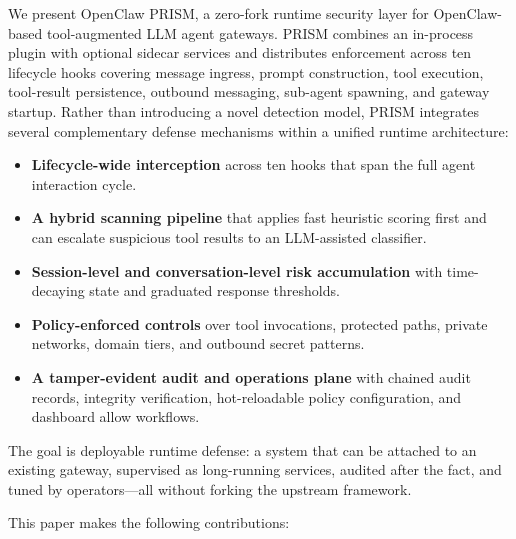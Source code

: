 We present OpenClaw PRISM, a zero-fork runtime security layer for OpenClaw-based tool-augmented LLM agent gateways. PRISM combines an in-process plugin with optional sidecar services and distributes enforcement across ten lifecycle hooks covering message ingress, prompt construction, tool execution, tool-result persistence, outbound messaging, sub-agent spawning, and gateway startup. Rather than introducing a novel detection model, PRISM integrates several complementary defense mechanisms within a unified runtime architecture:

\begin{itemize}[leftmargin=1.5em]
  \item \textbf{Lifecycle-wide interception} across ten hooks that span the full agent interaction cycle.
  \item \textbf{A hybrid scanning pipeline} that applies fast heuristic scoring first and can escalate suspicious tool results to an LLM-assisted classifier.
  \item \textbf{Session-level and conversation-level risk accumulation} with time-decaying state and graduated response thresholds.
  \item \textbf{Policy-enforced controls} over tool invocations, protected paths, private networks, domain tiers, and outbound secret patterns.
  \item \textbf{A tamper-evident audit and operations plane} with chained audit records, integrity verification, hot-reloadable policy configuration, and dashboard allow workflows.
\end{itemize}

The goal is deployable runtime defense: a system that can be attached to an existing gateway, supervised as long-running services, audited after the fact, and tuned by operators---all without forking the upstream framework.

This paper makes the following contributions:

